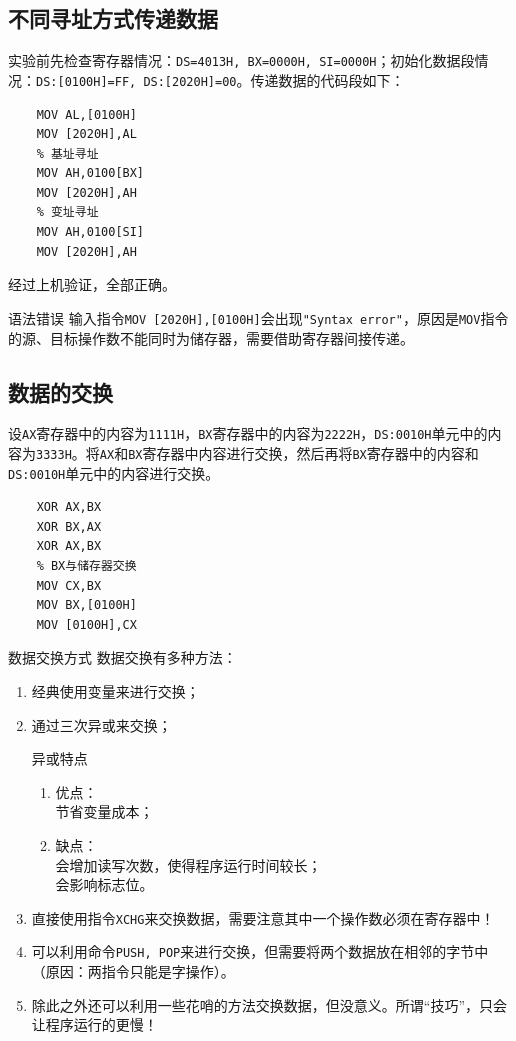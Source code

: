 \documentclass[11pt]{SEU-Digital-Report}
\begin{document}
\subsection{不同寻址方式传递数据}
实验前先检查寄存器情况：\texttt{DS=4013H, BX=0000H, SI=0000H}；初始化数据段情况：\texttt{DS:[0100H]=FF, DS:[2020H]=00}。传递数据的代码段如下：
\begin{lstlisting}[language={[x86masm]Assembler},title=code]
    % 直接寻址
    MOV AL,[0100H]
    MOV [2020H],AL
    % 基址寻址
    MOV AH,0100[BX]
    MOV [2020H],AH
    % 变址寻址
    MOV AH,0100[SI]
    MOV [2020H],AH
\end{lstlisting}
经过上机验证，全部正确。
\begin{note}{语法错误}{}
    输入指令\texttt{MOV [2020H],[0100H]}会出现\texttt{"Syntax error"}，原因是\texttt{MOV}指令的源、目标操作数不能同时为储存器，需要借助寄存器间接传递。
\end{note}

\subsection{数据的交换}
设\texttt{AX}寄存器中的内容为\texttt{1111H}，\texttt{BX}寄存器中的内容为\texttt{2222H}，\texttt{DS:0010H}单元中的内容为\texttt{3333H}。将\texttt{AX}和\texttt{BX}寄存器中内容进行交换，然后再将\texttt{BX}寄存器中的内容和\texttt{DS:0010H}单元中的内容进行交换。
\begin{lstlisting}[language={[x86masm]Assembler},title=code]
    % AX与BX交换
    XOR AX,BX
    XOR BX,AX
    XOR AX,BX
    % BX与储存器交换
    MOV CX,BX
    MOV BX,[0100H]
    MOV [0100H],CX
\end{lstlisting}
\begin{analyze}{数据交换方式}{}
    数据交换有多种方法：
    \begin{enumerate}
        \item 经典使用变量来进行交换；
        \item 通过三次异或来交换；
        \begin{idea}{异或特点}{}
            \begin{enumerate}
                \item 优点：\\节省变量成本；
                \item 缺点：\\会增加读写次数，使得程序运行时间较长；\\会影响标志位。
            \end{enumerate}
        \end{idea}
        \item 直接使用指令\texttt{XCHG}来交换数据，需要注意其中一个操作数必须在寄存器中！
        \item 可以利用命令\texttt{PUSH, POP}来进行交换，但需要将两个数据放在相邻的字节中（原因：两指令只能是字操作）。
        \item 除此之外还可以利用一些花哨的方法交换数据，但没意义。所谓“技巧”，只会让程序运行的更慢！
    \end{enumerate}
\end{analyze}
\end{document}
